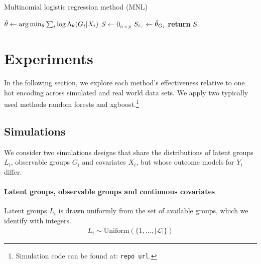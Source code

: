 \documentclass{article}
\theoremstyle{plain}
\theoremstyle{definition}
\theoremstyle{remark}
\begin{document}
\begin{algorithm}
\caption{Multinomial logistic regression method (MNL)} \label{alg:mnl}
\begin{algorithmic}[1]

\State $\hat{\theta} \gets \arg\min_{\theta} \sum_{i} \log \Lambda_{\theta}(G_{i}|X_{i})$
\State $S \gets 0_{n \times p}$
  \State $S_{i,\cdot} \gets \hat{\theta}_{G_{i}}$
\EndFor
\State \textbf{return} $S$
\EndProcedure
\end{algorithmic}
\end{algorithm}





\section{Experiments}

In the following section, we explore each method's effectiveness relative to one hot encoding across simulated and real world data sets. We apply two typically used methods random forests and xgboost.\footnote{Simulation code can be found at: \texttt{repo url}.}

\subsection{Simulations}
\label{sec:simulations}

We consider two simulations designs that share the distributions of latent groups $L_{i}$, observable groups $G_{i}$ and covariates $X_{i}$, but whose outcome models for $Y_{i}$ differ.

\paragraph{Latent groups, observable groups and continuous covariates} Latent groups $L_{i}$ is drawn uniformly from the set of available groups, which we identify with integers.
\begin{align}
    L_{i} \sim \text{Uniform}(\{1,...,|\mathcal{L}|\})
    \label{eq:latent_groups}
\end{align}
\end{document}
